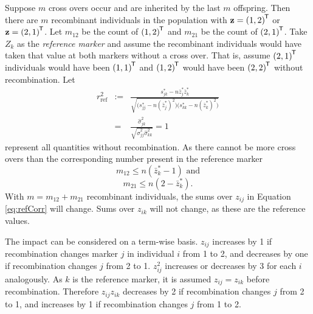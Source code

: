 \documentclass[sts]{imsart}
\newcommand{\ve}[1]{\mathbf{#1}}           %
\newcommand{\tr}[1]{{#1}^{\mkern-1.5mu\mathsf{T}}}              %
\begin{document}
Suppose $m$ cross overs occur and are inherited by the last $m$ offspring. Then there are $m$ recombinant individuals in the population with $\ve{z} = \tr{(1,2)}$ or $\ve{z} = \tr{(2,1)}$. Let $m_{12}$ be the count of $\tr{(1,2)}$ and $m_{21}$ be the count of $\tr{(2,1)}$. Take $Z_k$ as the \emph{reference marker} and assume the recombinant individuals would have taken that value at both markers without a cross over. That is, assume $\tr{(2,1)}$ individuals would have been $\tr{(1,1)}$ and $\tr{(1,2)}$ would have been $\tr{(2,2)}$ without recombination. Let
\begin{eqnarray} 
  r^2_{\text{ref}} & := & \frac{ s_{jk}^* - n \bar{z}_{j}^* \bar{z}_{k}^*}{\sqrt{ \big ( s_{jj}^* - n (\bar{z}_{j}^*)^2 \big ) \big ( s_{kk}^* - n (\bar{z}_{k}^*)^2 \big )}} \label{eq:refCorr} \\
  & = & \frac{\widehat{\sigma}^2_{jk}}{\sqrt{ \widehat{\sigma}^2_{jj} \widehat{\sigma}^2_{kk} }} = 1\nonumber
\end{eqnarray}
represent all quantities without recombination.
As there cannot be more cross overs than the corresponding number present in the reference marker
$$m_{12} \leq n(\bar{z}_k^* - 1) \text{ and}$$
$$m_{21} \leq n(2 - \bar{z}_k^*).$$
With $m = m_{12} + m_{21}$ recombinant individuals, the sums over $z_{ij}$ in Equation \ref{eq:refCorr} will change. Sums over $z_{ik}$ will not change, as these are the reference values.

The impact can be considered on a term-wise basis. $z_{ij}$ increases by 1 if recombination changes marker $j$ in individual $i$ from 1 to 2, and decreases by one if recombination changes $j$ from 2 to 1. $z_{ij}^2$ increases or decreases by 3 for each $i$ analogously. As $k$ is the reference marker, it is assumed $z_{ij} = z_{ik}$ before recombination. Therefore $z_{ij} z_{ik}$ decreases by 2 if recombination changes $j$ from 2 to 1, and increases by 1 if recombination changes $j$ from 1 to 2.
\end{document}
